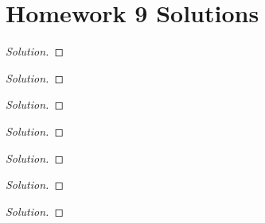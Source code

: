 \chapter{Homework 9 Solutions}
\begin{problem}
\end{problem}
\begin{proof}[Solution]
\end{proof}

\begin{problem}
\end{problem}
\begin{proof}[Solution]
\end{proof}

\begin{problem}
\end{problem}
\begin{proof}[Solution]
\end{proof}

\begin{problem}
\end{problem}
\begin{proof}[Solution]
\end{proof}

\begin{problem}
\end{problem}
\begin{proof}[Solution]
\end{proof}

\begin{problem}
\end{problem}
\begin{proof}[Solution]
\end{proof}

\begin{problem}
\end{problem}
\begin{proof}[Solution]
\end{proof}

